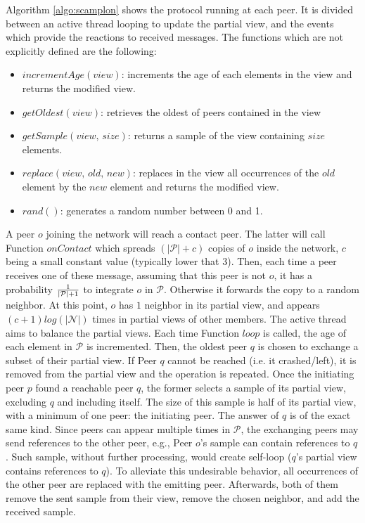 \begin{asparadesc}
\item [Algorithm]\ref{algo:scamplon} shows the \SCAMPLON{} protocol running at
  each peer. It is divided between an active thread looping to update the
  partial view, and the events which provide the reactions to received
  messages. The functions which are not explicitly defined are the following:
  \begin{itemize}
  \item $incrementAge(view)$: increments the age of each elements in the view
    and returns the modified view.
  \item $getOldest(view)$: retrieves the oldest of peers contained in the view
  \item $getSample(view, \, size)$: returns a sample of the view containing
    $size$ elements.
  \item $replace(view,\,old,\,new)$: replaces in the view all occurrences of
    the $old$ element by the $new$ element and returns the modified view.
  \item $rand()$: generates a random number between 0 and 1.
  \end{itemize}
  A peer $o$ joining the network will reach a contact peer. The latter will
  call Function $onContact$ which spreads $(|\mathcal{P}|+c)$ copies of $o$
  inside the network, $c$ being a small constant value (typically lower that
  $3$). Then, each time a peer receives one of these message, assuming that
  this peer is not $o$, it has a probability $1\over{|\mathcal{P}|+1}$ to
  integrate $o$ in $\mathcal{P}$. Otherwise it forwards the copy to a random
  neighbor.  At this point, $o$ has $1$ neighbor in its partial view, and
  appears $(c+1)log(|\mathcal{N}|)$ times in partial views of other
  members. The active thread aims to balance the partial views. Each time
  Function $loop$ is called, the age of each element in $\mathcal{P}$ is
  incremented. Then, the oldest peer $q$ is chosen to exchange a subset of
  their partial view. If Peer $q$ cannot be reached (i.e. it crashed/left), it
  is removed from the partial view and the operation is repeated. Once the
  initiating peer $p$ found a reachable peer $q$, the former selects a sample
  of its partial view, excluding $q$ and including itself. The size of this
  sample is half of its partial view, with a minimum of one peer: the
  initiating peer. The answer of $q$ is of the exact same kind. Since peers can
  appear multiple times in $\mathcal{P}$, the exchanging peers may send
  references to the other peer, e.g., Peer $o$'s sample can contain references
  to $q$. Such sample, without further processing, would create self-loop
  ($q$'s partial view contains references to $q$). To alleviate this
  undesirable behavior, all occurrences of the other peer are replaced with the
  emitting peer.  Afterwards, both of them remove the sent sample from their
  view, remove the chosen neighbor, and add the received sample.
\end{asparadesc}


